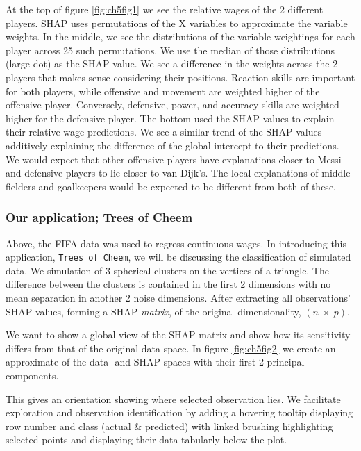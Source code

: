 \documentclass{template/monashthesis}
\begin{document}
At the top of figure \ref{fig:ch5fig1} we see the relative wages of the 2 different players. SHAP uses permutations of the X variables to approximate the variable weights. In the middle, we see the distributions of the variable weightings for each player across 25 such permutations. We use the median of those distributions (large dot) as the SHAP value. We see a difference in the weights across the 2 players that makes sense considering their positions. Reaction skills are important for both players, while offensive and movement are weighted higher of the offensive player. Conversely, defensive, power, and accuracy skills are weighted higher for the defensive player. The bottom used the SHAP values to explain their relative wage predictions. We see a similar trend of the SHAP values additively explaining the difference of the global intercept to their predictions. We would expect that other offensive players have explanations closer to Messi and defensive players to lie closer to van Dijk's. The local explanations of middle fielders and goalkeepers would be expected to be different from both of these.

\hypertarget{our-application-trees-of-cheem}{%
\subsubsection{Our application; Trees of Cheem}\label{our-application-trees-of-cheem}}

Above, the FIFA data was used to regress continuous wages. In introducing this application, \texttt{Trees\ of\ Cheem}, we will be discussing the classification of simulated data. We simulation of 3 spherical clusters on the vertices of a triangle. The difference between the clusters is contained in the first 2 dimensions with no mean separation in another 2 noise dimensions. After extracting all observations' SHAP values, forming a SHAP \emph{matrix}, of the original dimensionality, \((n~\times~p)\).

We want to show a global view of the SHAP matrix and show how its sensitivity differs from that of the original data space. In figure \ref{fig:ch5fig2} we create an approximate of the data- and SHAP-spaces with their first 2 principal components.

This gives an orientation showing where selected observation lies. We facilitate exploration and observation identification by adding a hovering tooltip displaying row number and class (actual \& predicted) with linked brushing highlighting selected points and displaying their data tabularly below the plot.
\end{document}

